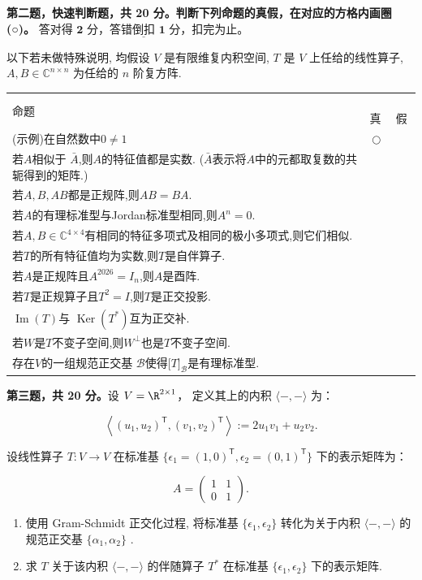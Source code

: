 \textbf{第二题，快速判断题，共 20
分。判断下列命题的真假，在对应的方格内画圈(○)。}
$\underline{\textbf{答对得 2 分，答错倒扣 1 分，扣完为止。}}$

以下若未做特殊说明, 均假设 \(V\) 是有限维复内积空间, \(T\) 是 \(V\) 上任给的线性算子, 
\(A, B \in \mathbb{C}^{n \times n}\) 为任给的 \(n\) 阶复方阵.

\begin{center}\begin{tabular}{lcc}
命题 & \,真\, & \,假\, \\
(示例)在自然数中$0 \neq 1$ & $\bigcirc$ & \\
若$A$相似于 $\bar{A}$,则$A$的特征值都是实数. ($\bar{A}$表示将$A$中的元都取复数的共轭得到的矩阵.) & & \\
若$A,B,AB$都是正规阵,则$AB=BA$. & & \\
若$A$的有理标准型与Jordan标准型相同,则$A^{n}=0$. & & \\
若$A,B \in \mathbb{C}^{4 \times4}$有相同的特征多项式及相同的极小多项式,则它们相似. & & \\
若$T$的所有特征值均为实数,则$T$是自伴算子. & & \\
若$A$是正规阵且$A^{2026}=I_{n}$,则$A$是酉阵. & & \\
若$T$是正规算子且$T^{2}=I$,则$T$是正交投影. & & \\
$\operatorname{Im}(T)$与 $\operatorname{Ker}(T^*)$互为正交补. & & \\
若$W$是$T$不变子空间,则$W^{\perp}$也是$T$不变子空间. & & \\
存在$V$的一组规范正交基 $\mathcal{B}$使得${[}T{]}_{ \mathcal{B}}$是有理标准型. & & 
\end{tabular}\end{center}

\textbf{第三题，共 20 分。}设 \(V = \R^{2 \times 1}\)，
定义其上的内积 \(\langle -, - \rangle\) 为：

\[\left\langle \left(u_{1}, u_{2}\right)^{\mathsf{T}}, \left(v_{1}, v_{2}\right)^{\mathsf{T}} \right\rangle := 2u_{1}v_{1} + u_{2}v_{2}.\]

设线性算子 \(T: V \to V\) 在标准基
\(\{\epsilon_1 = (1,0)^{\mathsf{T}}, \epsilon_2 = (0,1)^{\mathsf{T}}\}\)
下的表示矩阵为：

\[A = \begin{pmatrix} 1 & 1 \\ 0 & 1 \end{pmatrix}.\]

\begin{enumerate}
\item
  使用 Gram-Schmidt 正交化过程, 将标准基 \(\{\epsilon_1, \epsilon_2\}\)
  转化为关于内积 \(\langle -, - \rangle\) 的规范正交基 \(\{\alpha_1, \alpha_2\}\) .
\item
  求 \(T\) 关于该内积 \(\langle -, - \rangle\) 的伴随算子 \(T^{*}\)
  在标准基 \(\{\epsilon_1, \epsilon_2\}\) 下的表示矩阵.
\end{enumerate}

